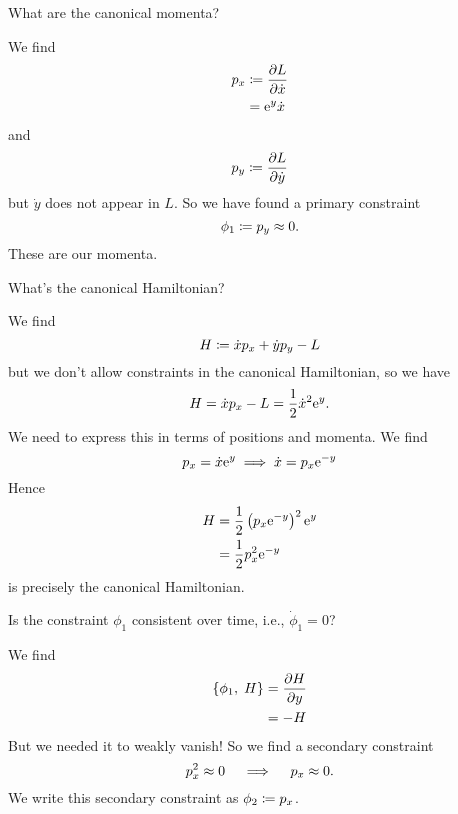  What are the canonical momenta?

\begin{soln}
We find
\begin{equation}
\begin{split}
p_{x} &\coloneqq\frac{\partial L}{\partial\dot{x}}\\
&=\mathrm{e}^{y}\dot{x}
\end{split}
\end{equation}
and
\begin{equation}
p_{y} \coloneqq \frac{\partial L}{\partial\dot{y}}
\end{equation}
but $\dot{y}$ does not appear in $L$. So we have found a primary constraint
\begin{equation}
\phi_{1} \coloneqq p_{y}\approx 0.
\end{equation}
These are our momenta.
\end{soln}

 What's the canonical Hamiltonian?

\begin{soln}
We find
\begin{equation}
H \coloneqq \dot{x}p_{x} + \dot{y}p_{y} - L
\end{equation}
but we don't allow constraints in the canonical Hamiltonian, so we have
\begin{equation}
H = \dot{x}p_{x} - L = \frac{1}{2}\dot{x}^{2}\mathrm{e}^{y}.
\end{equation}
We need to express this in terms of positions and momenta. We find
\begin{equation}
p_{x} = \dot{x}\mathrm{e}^{y}\implies \dot{x} = p_{x}\mathrm{e}^{-y}
\end{equation}
Hence
\begin{equation}
\begin{split}
H &= \frac{1}{2}\left(p_{x}\mathrm{e}^{-y}\right)^{2}\mathrm{e}^{y}\\
&=\frac{1}{2}p_{x}^{2}\mathrm{e}^{-y}
\end{split}
\end{equation}
is precisely the canonical Hamiltonian.
\end{soln}

 Is the constraint $\phi_{1}$ consistent over time, i.e., $\dot{\phi}_{1}=0$?

\begin{soln}
We find
\begin{equation}
\begin{split}
\left\{\phi_{1},\;H\right\} &= \frac{\partial H}{\partial y}\\
&= -H
\end{split}
\end{equation}
But we needed it to weakly vanish! So we find a secondary constraint
\begin{equation}
p_{x}^{2}\approx 0\quad\implies\quad p_{x}\approx0.
\end{equation}
We write this secondary constraint as $\phi_{2}\coloneqq p_{x}$.
\end{soln}

